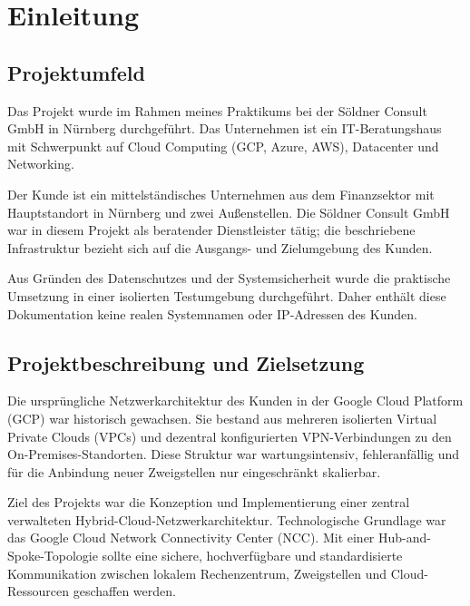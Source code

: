 \chapter{Einleitung}

\section{Projektumfeld}
Das Projekt wurde im Rahmen meines Praktikums bei der Söldner Consult GmbH in Nürnberg durchgeführt. Das Unternehmen ist ein IT-Beratungshaus mit Schwerpunkt auf Cloud Computing (GCP, Azure, AWS), Datacenter und Networking.

Der Kunde ist ein mittelständisches Unternehmen aus dem Finanzsektor mit Hauptstandort in Nürnberg und zwei Außenstellen. Die Söldner Consult GmbH war in diesem Projekt als beratender Dienstleister tätig; die beschriebene Infrastruktur bezieht sich auf die Ausgangs- und Zielumgebung des Kunden.

Aus Gründen des Datenschutzes und der Systemsicherheit wurde die praktische Umsetzung in einer isolierten Testumgebung durchgeführt. Daher enthält diese Dokumentation keine realen Systemnamen oder IP-Adressen des Kunden.

\section{Projektbeschreibung und Zielsetzung}
Die ursprüngliche Netzwerkarchitektur des Kunden in der Google Cloud Platform (GCP) war historisch gewachsen. Sie bestand aus mehreren isolierten Virtual Private Clouds (VPCs) und dezentral konfigurierten VPN-Verbindungen zu den On-Premises-Standorten. Diese Struktur war wartungsintensiv, fehleranfällig und für die Anbindung neuer Zweigstellen nur eingeschränkt skalierbar.

Ziel des Projekts war die Konzeption und Implementierung einer zentral verwalteten Hybrid-Cloud-Netzwerkarchitektur. Technologische Grundlage war das Google Cloud Network Connectivity Center (NCC). Mit einer Hub-and-Spoke-Topologie sollte eine sichere, hochverfügbare und standardisierte Kommunikation zwischen lokalem Rechenzentrum, Zweigstellen und Cloud-Ressourcen geschaffen werden.